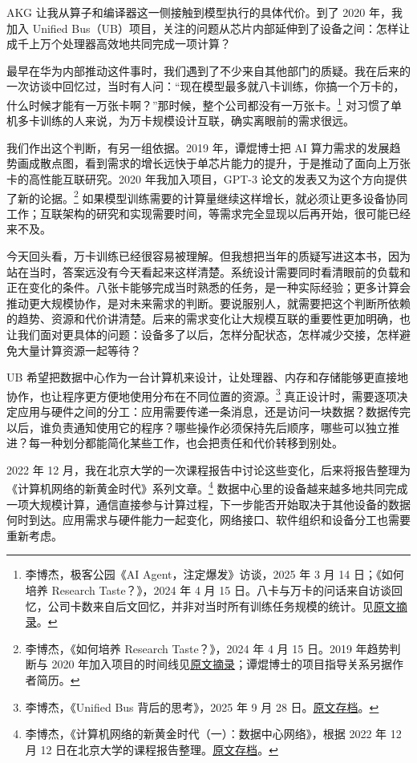 AKG 让我从算子和编译器这一侧接触到模型执行的具体代价。到了 2020
年，我加入 Unified
Bus（UB）项目，关注的问题从芯片内部延伸到了设备之间：怎样让成千上万个处理器高效地共同完成一项计算？

最早在华为内部推动这件事时，我们遇到了不少来自其他部门的质疑。我在后来的一次访谈中回忆过，当时有人问：``现在模型最多就八卡训练，你搞一个万卡的，什么时候才能有一万张卡啊？''那时候，整个公司都没有一万张卡。\footnote{李博杰，极客公园《AI
  Agent，注定爆发》访谈，2025 年 3 月 14 日；《如何培养 Research
  Taste？》，2024 年 4 月 15
  日。八卡与万卡的问话来自访谈回忆，公司卡数来自后文回忆，并非对当时所有训练任务规模的统计。见\href{../references/editorial-context/2026-09-10/preface-author-stories.md}{原文摘录}。}
对习惯了单机多卡训练的人来说，为万卡规模设计互联，确实离眼前的需求很远。

我们作出这个判断，有另一组依据。2019 年，谭焜博士把 AI
算力需求的发展趋势画成散点图，看到需求的增长远快于单芯片能力的提升，于是推动了面向上万张卡的高性能互联研究。2020
年我加入项目，GPT-3 论文的发表又为这个方向提供了新的论据。\footnote{李博杰，《如何培养
  Research Taste？》，2024 年 4 月 15 日。2019 年趋势判断与 2020
  年加入项目的时间线见\href{../references/editorial-context/2026-09-10/preface-author-stories.md}{原文摘录}；谭焜博士的项目指导关系另据作者简历。}
如果模型训练需要的计算量继续这样增长，就必须让更多设备协同工作；互联架构的研究和实现需要时间，等需求完全显现以后再开始，很可能已经来不及。

今天回头看，万卡训练已经很容易被理解。但我想把当年的质疑写进这本书，因为站在当时，答案远没有今天看起来这样清楚。系统设计需要同时看清眼前的负载和正在变化的条件。八张卡能够完成当时熟悉的任务，是一种实际经验；更多计算会推动更大规模协作，是对未来需求的判断。要说服别人，就需要把这个判断所依赖的趋势、资源和代价讲清楚。后来的需求变化让大规模互联的重要性更加明确，也让我们面对更具体的问题：设备多了以后，怎样分配状态，怎样减少交接，怎样避免大量计算资源一起等待？

UB
希望把数据中心作为一台计算机来设计，让处理器、内存和存储能够更直接地协作，也让程序更方便地使用分布在不同位置的资源。\footnote{李博杰，《Unified
  Bus 背后的思考》，2025 年 9 月 28
  日。\href{../references/files/documents/ub-reflection.md}{原文存档}。}
真正设计时，需要逐项决定应用与硬件之间的分工：应用需要传递一条消息，还是访问一块数据？数据传完以后，谁负责通知使用它的程序？哪些操作必须保持先后顺序，哪些可以独立推进？每一种划分都能简化某些工作，也会把责任和代价转移到别处。

2022 年 12
月，我在北京大学的一次课程报告中讨论这些变化，后来将报告整理为《计算机网络的新黄金时代》系列文章。\footnote{李博杰，《计算机网络的新黄金时代（一）：数据中心网络》，根据
  2022 年 12 月 12
  日在北京大学的课程报告整理。\href{../references/files/documents/network-golden-1.md}{原文存档}。}
数据中心里的设备越来越多地共同完成一项大规模计算，通信直接参与计算过程，下一步能否开始取决于其他设备的数据何时到达。应用需求与硬件能力一起变化，网络接口、软件组织和设备分工也需要重新考虑。

